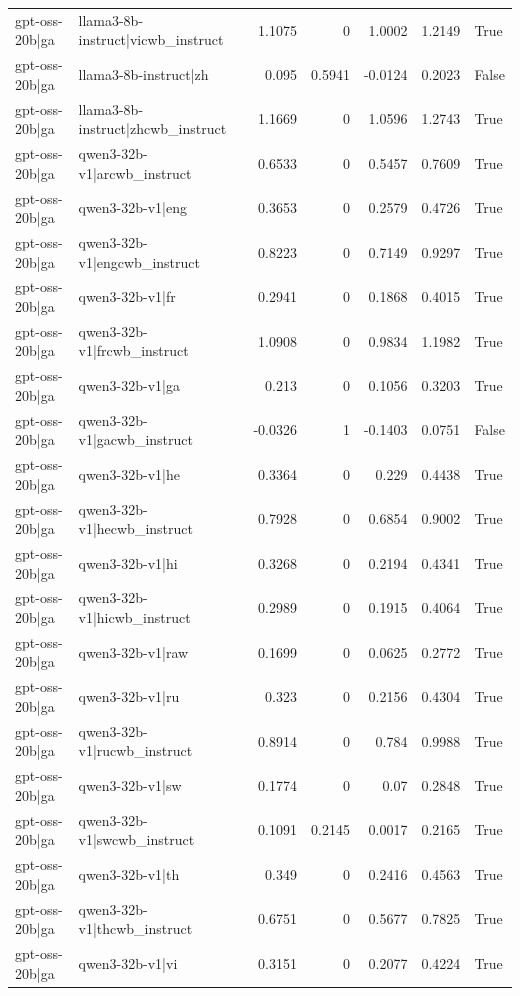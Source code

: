 \begin{table}
\begin{tabular}{l l r r r r l}
gpt-oss-20b|ga & llama3-8b-instruct|vicwb_instruct & 1.1075 & 0 & 1.0002 & 1.2149 & True \\
gpt-oss-20b|ga & llama3-8b-instruct|zh & 0.095 & 0.5941 & -0.0124 & 0.2023 & False \\
gpt-oss-20b|ga & llama3-8b-instruct|zhcwb_instruct & 1.1669 & 0 & 1.0596 & 1.2743 & True \\
gpt-oss-20b|ga & qwen3-32b-v1|arcwb_instruct & 0.6533 & 0 & 0.5457 & 0.7609 & True \\
gpt-oss-20b|ga & qwen3-32b-v1|eng & 0.3653 & 0 & 0.2579 & 0.4726 & True \\
gpt-oss-20b|ga & qwen3-32b-v1|engcwb_instruct & 0.8223 & 0 & 0.7149 & 0.9297 & True \\
gpt-oss-20b|ga & qwen3-32b-v1|fr & 0.2941 & 0 & 0.1868 & 0.4015 & True \\
gpt-oss-20b|ga & qwen3-32b-v1|frcwb_instruct & 1.0908 & 0 & 0.9834 & 1.1982 & True \\
gpt-oss-20b|ga & qwen3-32b-v1|ga & 0.213 & 0 & 0.1056 & 0.3203 & True \\
gpt-oss-20b|ga & qwen3-32b-v1|gacwb_instruct & -0.0326 & 1 & -0.1403 & 0.0751 & False \\
gpt-oss-20b|ga & qwen3-32b-v1|he & 0.3364 & 0 & 0.229 & 0.4438 & True \\
gpt-oss-20b|ga & qwen3-32b-v1|hecwb_instruct & 0.7928 & 0 & 0.6854 & 0.9002 & True \\
gpt-oss-20b|ga & qwen3-32b-v1|hi & 0.3268 & 0 & 0.2194 & 0.4341 & True \\
gpt-oss-20b|ga & qwen3-32b-v1|hicwb_instruct & 0.2989 & 0 & 0.1915 & 0.4064 & True \\
gpt-oss-20b|ga & qwen3-32b-v1|raw & 0.1699 & 0 & 0.0625 & 0.2772 & True \\
gpt-oss-20b|ga & qwen3-32b-v1|ru & 0.323 & 0 & 0.2156 & 0.4304 & True \\
gpt-oss-20b|ga & qwen3-32b-v1|rucwb_instruct & 0.8914 & 0 & 0.784 & 0.9988 & True \\
gpt-oss-20b|ga & qwen3-32b-v1|sw & 0.1774 & 0 & 0.07 & 0.2848 & True \\
gpt-oss-20b|ga & qwen3-32b-v1|swcwb_instruct & 0.1091 & 0.2145 & 0.0017 & 0.2165 & True \\
gpt-oss-20b|ga & qwen3-32b-v1|th & 0.349 & 0 & 0.2416 & 0.4563 & True \\
gpt-oss-20b|ga & qwen3-32b-v1|thcwb_instruct & 0.6751 & 0 & 0.5677 & 0.7825 & True \\
gpt-oss-20b|ga & qwen3-32b-v1|vi & 0.3151 & 0 & 0.2077 & 0.4224 & True \\

\end{tabular}
\end{table}
